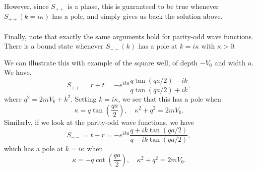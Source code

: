 However, since $S_{++}$ is a phase, this is guaranteed to be true whenever $S_{++}(k = i\kappa)$ has a pole, and simply gives us back the solution above.
\\ \\
Finally, note that exactly the same arguments hold for parity-odd wave functions.
There is a bound state whenever $S_{--}(k)$ has a pole at $k = i\kappa$ with $\kappa > 0$.
\begin{example}
We can illustrate this with example of the square well, of depth $-V_0$ and width $a$.
We have,
\[S_{++} = r + t = -e^{ika} \frac{q\tan(qa/2)-ik}{q\tan(qa/2)+ik} ,\]
where $q^2 = 2mV_0 + k^2$. Setting $k = i\kappa$, we see that this has a pole when
\[\kappa = q\tan(\frac{qa}{2}) , \quad \kappa^2 + q^2 = 2mV_0.\] 
Similarly, if we look at the parity-odd wave functions, we have
\[S_{--} = t - r = -e^{ika} \frac{q+ik\tan(qa/2)}{q-ik\tan(qa/2)} ,\]
which has a pole at $k = i\kappa$ when
\[\kappa = -q\cot(\frac{qa}{2}) , \quad \kappa^2 + q^2 = 2mV_0.\]
\end{example}

